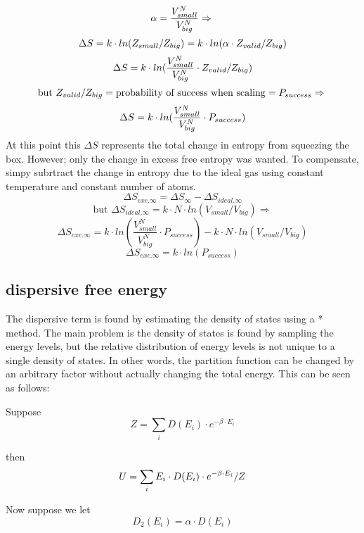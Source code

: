 $$\newline \alpha=\frac{V_{small}^N}{V_{big}^N} \Rightarrow\newline$$
$$\Delta S=k\cdot ln(Z_{small}/Z_{big})=k\cdot ln(\alpha\cdot Z_{valid}/Z_{big})\newline$$
$$\Delta S=k\cdot ln(\frac{V_{small}^N}{V_{big}^N}\cdot Z_{valid}/Z_{big})\newline$$
$$\text{but }Z_{valid}/Z_{big}=\text{probability of success when scaling}=P_{success}\Rightarrow\newline$$
$$\Delta S=k\cdot ln(\frac{V_{small}^N}{V_{big}^N}\cdot P_{success}
)\newline$$
At this point this $\Delta S$ represents the total change in entropy from squeezing the box. However; only the change in excess free entropy was wanted. To compensate, simpy subrtract the change in entropy due to the ideal gas using constant temperature and constant number of atoms.
$$\Delta S_{exc.\infty}=\Delta S_{\infty}-\Delta S_{ideal.\infty}$$
$$\text{but }\Delta S_{ideal.\infty}=k\cdot N\cdot ln(V_{small}/V_{big})\Rightarrow$$
$$\Delta S_{exc.\infty}=k\cdot ln(\frac{V_{small}^N}{V_{big}^N}\cdot P_{success})-k\cdot N\cdot ln(V_{small}/V_{big})$$
$$\Delta S_{exc.\infty}=k\cdot ln(P_{success})$$


\subsection{dispersive free energy}
The dispersive term is found by estimating the density of states using a * method. The main problem is the density of states is found by sampling the energy levels, but the relative distribution of energy levels is not unique to a single density of states. In other words, the partition function can be changed by an arbitrary factor without actually changing the total energy. This can be seen as follows:

Suppose $$Z=\sum_i D(E_i)\cdot e^{-\beta\cdot E_i}$$

then $$U=\sum_i E_i\cdot D(E_i)\cdot e^{-\beta\cdot E_i}/Z\newline$$

Now suppose we let $$D_2(E_i)=\alpha\cdot D(E_i)$$

